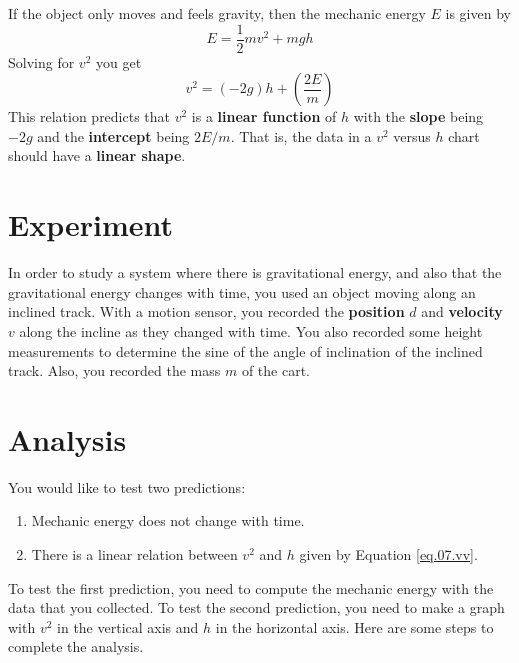If the object only moves and feels gravity, then the mechanic energy $E$ is given by
\begin{equation}
    E = \frac{1}{2} m v^{2} + m g h
\end{equation}
Solving for $v^{2}$ you get
\begin{equation}
    v^{2} = \left( - 2 g \right) h + \left( \frac{2 E}{m} \right)
    \label{eq.07.vv}
\end{equation}
This relation predicts that $v^{2}$ is a \textbf{linear function} of $h$ with the \textbf{slope} being $-2g$ and the \textbf{intercept} being $2 E / m$. That is, the data in a $v^{2}$ versus $h$ chart should have a \textbf{linear shape}.
\section{Experiment}
In order to study a system where there is gravitational energy, and also that the gravitational energy changes with time, you used an object moving along an inclined track. With a motion sensor, you recorded the \textbf{position} $d$ and \textbf{velocity} $v$ along the incline as they changed with time. You also recorded some height measurements to determine the sine of the angle of inclination of the inclined track. Also, you recorded the mass $m$ of the cart.
\section{Analysis}
You would like to test two predictions:
\begin{enumerate}
    \item Mechanic energy does not change with time.
    \item There is a linear relation between $v^{2}$ and $h$ given by Equation \ref{eq.07.vv}.
\end{enumerate}
To test the first prediction, you need to compute the mechanic energy with the data that you collected. To test the second prediction, you need to make a graph with $v^{2}$ in the vertical axis and $h$ in the horizontal axis. Here are some steps to complete the analysis.
